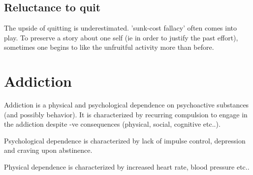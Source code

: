 \documentclass[oneside, article]{memoir}
\begin{document}
\subsection{Reluctance to quit}
The upside of quitting is underestimated. 'sunk-cost fallacy' often comes into play. To preserve a story about one self (ie in order to justify the past effort), sometimes one begins to like the unfruitful activity more than before.

\section{Addiction}
Addiction is a physical and psychological dependence on psychoactive substances (and possibly behavior). It is characterized by recurring compulsion to engage in the addiction despite -ve consequences (physical, social, cognitive etc..).

Psychological dependence is characterized by lack of impulse control, depression and craving upon abstinence.

Physical dependence is characterized by increased heart rate, blood pressure etc..

% 
% 
\end{document}
